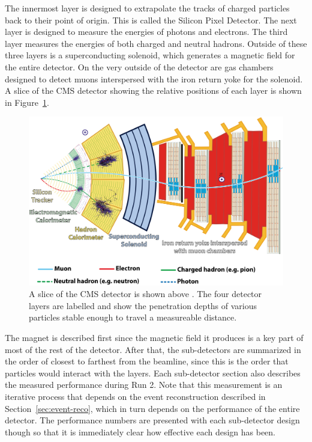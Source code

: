 The innermost layer is designed to extrapolate the tracks of charged particles
back to their point of origin.
This is called the Silicon Pixel Detector.
The next layer is designed to measure the energies of photons and electrons.
The third layer measures the energies of both charged and neutral hadrons.
Outside of these three layers is a superconducting solenoid,
which generates a magnetic field for the entire detector.
On the very outside of the detector are gas chambers designed to detect muons
interspersed with the iron return yoke for the solenoid.
A slice of the CMS detector showing the relative positions of each layer
is shown in Figure~\ref{fig:slice}.
\begin{figure}
  \centering
  \includegraphics[width=0.9\linewidth]{figures/CMSslice_whiteBackground.png}
  \caption[CMS detector slice]{
    A slice of the CMS detector is shown above \cite{Barney:2120661}.
    The four detector layers are labelled and show the penetration
    depths of various particles stable enough to travel a measureable distance.
    }
  \label{fig:slice}
\end{figure}

The magnet is described first since the magnetic field it produces is a key
part of most of the rest of the detector.
After that, the sub-detectors are summarized in the order of closest to farthest
from the beamline, since this is the order that particles would interact with the layers.
Each sub-detector section also describes the measured performance during Run 2.
Note that this measurement is an iterative process that depends on the event reconstruction
described in Section~\ref{sec:event-reco},
which in turn depends on the performance of the entire detector.
The performance numbers are presented with each sub-detector design though so that
it is immediately clear how effective each design has been.

